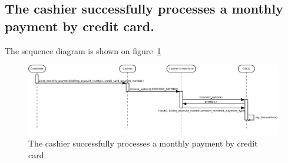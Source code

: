 \subsection{The cashier successfully processes a monthly payment by
credit card.}

The sequence diagram is shown on figure~\ref{fig:seq-diagram3}

\begin{landscape}
    \begin{figure}[!ht]
        \centering
        \includegraphics[width=\linewidth]{drafts/sequence_3.png}
        \caption{The cashier successfully processes a monthly payment by credit
        card.}
        \label{fig:seq-diagram3}
    \end{figure}
\end{landscape}
